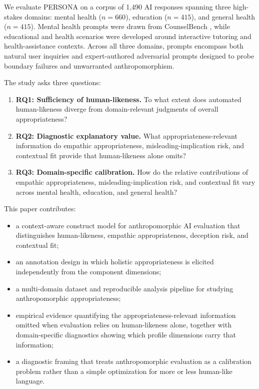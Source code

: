 \documentclass[manuscript,review,anonymous]{acmart}
\begin{document}
We evaluate PERSONA on a corpus of 1,490 AI responses spanning three high-stakes domains: mental health ($n=660$), education ($n=415$), and general health ($n=415$). Mental health prompts were drawn from CounselBench \cite{CounselBench2025}, while educational and health scenarios were developed around interactive tutoring and health-assistance contexts. Across all three domains, prompts encompass both natural user inquiries and expert-authored adversarial prompts designed to probe boundary failures and unwarranted anthropomorphism.

The study asks three questions:
\begin{enumerate}[leftmargin=*]
    \item \textbf{RQ1: Sufficiency of human-likeness.} To what extent does automated human-likeness diverge from domain-relevant judgments of overall appropriateness?
    \item \textbf{RQ2: Diagnostic explanatory value.} What appropriateness-relevant information do empathic appropriateness, misleading-implication risk, and contextual fit provide that human-likeness alone omits?
    \item \textbf{RQ3: Domain-specific calibration.} How do the relative contributions of empathic appropriateness, misleading-implication risk, and contextual fit vary across mental health, education, and general health?
\end{enumerate}

This paper contributes:
\begin{itemize}[leftmargin=*]
    \item a context-aware construct model for anthropomorphic AI evaluation that distinguishes human-likeness, empathic appropriateness, deception risk, and contextual fit;
    \item an annotation design in which holistic appropriateness is elicited independently from the component dimensions;
    \item a multi-domain dataset and reproducible analysis pipeline for studying anthropomorphic appropriateness;
    \item empirical evidence quantifying the appropriateness-relevant information omitted when evaluation relies on human-likeness alone, together with domain-specific diagnostics showing which profile dimensions carry that information;
    \item a diagnostic framing that treats anthropomorphic evaluation as a calibration problem rather than a simple optimization for more or less human-like language.
\end{itemize}
\end{document}
